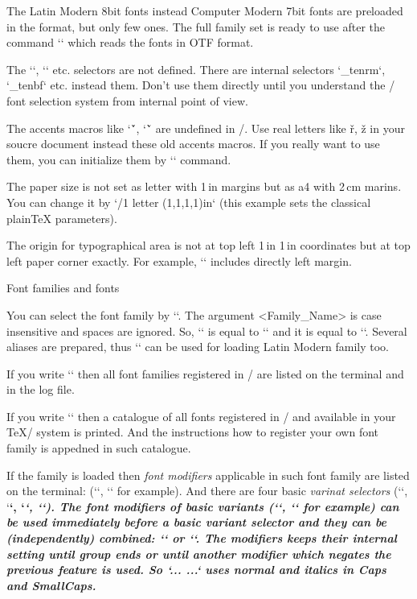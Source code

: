 \new
The Latin Modern 8bit fonts instead Computer Modern 7bit fonts are
preloaded in the format, but only few ones. The full family set is ready to
use after the command `\fontfam[LMfonts]` which reads the fonts in OTF
format.

\new
The `\tenrm`, `\tenbf` etc. selectors are not defined. There are internal
selectors `\_tenrm`, `\_tenbf` etc. instead them. Don't use them directly
until you understand the \OpTeX/ font selection system from
internal point of view.

\new
The accents macros like `\'`, `\v` are undefined in \OpTeX/. Use real
letters like ř, ž in your soucre document instead these old accents macros.
If you really want to use them, you can initialize them by `\oldaccents`
command.

\new
The paper size is not set as letter with 1\,in margins but as a4 with 2\,cm
marins. You can change it by `\margins/1 letter (1,1,1,1)in` (this example 
sets the classical plainTeX parameters).

\new
The origin for typographical area is not at top left 1\,in 1\,in coordinates
but at top left paper corner exactly. For example, `\hoffset` includes directly left
margin.


\sec Font families and fonts

You can select the font family by ``.
The argument <Family_Name> is case insensitive and spaces are ignored. So,
`\fontfam[LM Fonts]` is equal to `\fontfam[LMfonts]` and it is equal
to `\fontfam[lmfonts]`. Several aliases are prepared, thus 
`` can be used for loading Latin Modern family too.

If you write `\fontfam[?]` then all font families registered in \OpTeX/ 
are listed on the terminal and in the log file.

If you write `\fontfam[catalog]` then a catalogue of all fonts registered in
\OpTeX/ and available in your \TeX/ system is printed. And the instructions
how to register your own font family is appedned in such catalogue.

If the family is loaded then {\em font modifiers} applicable in such font family
are listed on the terminal: (`\caps`, `\cond` for example).
And there are four basic {\em varinat selectors} (`\rm`, `\bf`, `\it`, `\bi`).
The font modifiers of basic variants (`\caps`, `\cond` for example) can
be used immediately before a basic variant selector and they
can be (independently) combined: `\caps\it` or `\cond\caps\bf`. The
modifiers keeps their internal setting until group ends or until another
modifier which negates the previous feature is used. So
`\caps \rm... \it...`  uses normal and italics in Caps and SmallCaps.

